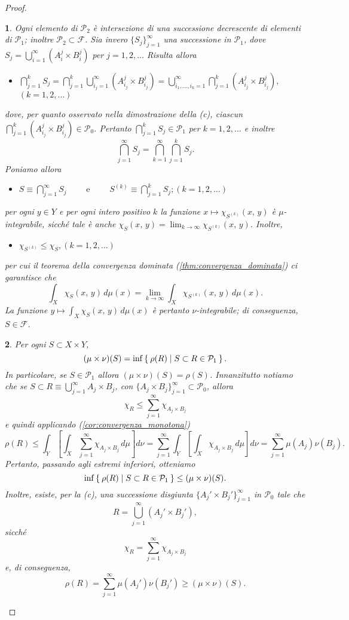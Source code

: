 \documentclass[a4paper,10pt,openright,oneside]{book}
\theoremstyle{theoremstyle}
\theoremstyle{theoremstylewoheader}
\theoremstyle{theoremstyle}
\theoremstyle{proofsecstyle}
\newtheorem{proofsec}{}
\theoremstyle{nonumberplain}
\newtheorem{proof}{Dim.}
\newcommand{\FF}{\ensuremath{\mathcal{F}}}
\newcommand{\PP}{\ensuremath{\mathcal{P}}}
\newcommand{\mymath}[2]{\begin{itemize}%
  \item[]\hfill\hbox{}\ensuremath{\displaystyle #1}\hfill\ensuremath{\displaystyle #2}%
  \end{itemize}}
\begin{document}
\begin{proof}
\begin{proofsec}
\emph{Ogni elemento di $\PP_2$ è intersezione di una successione \emph{decrescente} di elementi di $\PP_1$; inoltre $\PP_2 \subset \FF$.}\hspace{.5em} Sia invero $\{S_j\}_{j=1}^\infty$ una successione in $\PP_1$, dove $S_j = \bigcup_{i=1}^\infty (A_i^j \times B_i^j)$ per $j = 1, 2, \ldots$ Risulta allora \mymath{\bigcap_{j=1}^k S_j = \bigcap_{j=1}^k \bigcup_{i_j=1}^\infty (A_{i_j}^j \times B_{i_j}^j) = \bigcup_{i_1, \ldots, i_k = 1}^\infty \bigcap_{j=1}^k (A_{i_j}^j \times B_{i_j}^j),}{(k = 1, 2, \ldots)} dove, per quanto osservato nella dimostrazione della (c), ciascun $\bigcap_{j=1}^k (A_{i_j}^j \times B_{i_j}^j) \in \PP_0$. Pertanto $\bigcap_{j=1}^k S_j \in \PP_1$ per $k = 1, 2, \ldots$ e inoltre
\[
\bigcap_{j=1}^\infty S_j = \bigcap_{k=1}^\infty \bigcap_{j=1}^k S_j.
\]
Poniamo allora \mymath{S \equiv \bigcap_{j=1}^{\infty} S_j \qquad\text{ e }\qquad S^{(k)} \equiv \bigcap_{j=1}^k S_j;}{(k = 1, 2, \ldots)} per ogni $y \in Y$ e per ogni intero positivo $k$ la funzione $x \mapsto \chi_{S^{(k)}}(x,\, y)$ è $\mu$-integrabile, sicché tale è anche $\chi_S (x,\, y) = \lim_{k \to \infty} \chi_{S^{(k)}} (x,\, y)$. Inoltre, \mymath{\chi_{S^{(k)}} \le \chi_S,}{(k = 1, 2, \ldots)} per cui il teorema della convergenza dominata (\ref{thm:convergenza_dominata}) ci garantisce che 
\[
\int_X \chi_S(x,\, y)\, d\mu(x) = \lim_{k \to \infty} \int_X \chi_{S^{(k)}} (x,\, y)\, d\mu(x).
\]
La funzione $y \mapsto \int_X \chi_S(x,\, y)\, d\mu(x)$ è pertanto $\nu$-integrabile; di conseguenza, $S \in \FF$.
\end{proofsec}

\begin{proofsec}
\emph{Per ogni $S \subset X \times Y$,}
\[
(\mu\times\nu)(S) = \inf\Set{ \rho(R) | S \subset R \in \PP_1 }.
\]
\emph{In particolare, se $S \in \PP_1$ allora $(\mu\times\nu)(S) = \rho(S)$.}\hspace{.5em} Innanzitutto notiamo che se $S \subset R \equiv \bigcup_{j=1}^\infty A_j \times B_j$, con $\{A_j \times B_j\}_{j=1}^\infty \subset \PP_0$, allora
\[
\chi_R \le \sum_{j=1}^\infty \chi_{A_j \times B_j}
\]
e quindi applicando (\ref{cor:convergenza_monotona})
\[
\rho(R) \le \int_Y \left[\int_X \sum_{j=1}^\infty \chi_{A_j \times B_j}\, d\mu\right] d\nu = \sum_{j=1}^\infty \int_Y \left[\int_X \chi_{A_j \times B_j}\, d\mu\right] d\nu = \sum_{j=1}^\infty \mu(A_j)\nu(B_j).
\]
Pertanto, passando agli estremi inferiori, otteniamo
\[
\inf\Set{ \rho(R) | S \subset R \in \PP_1 } \le (\mu\times\nu)(S).
\]
Inoltre, esiste, per la (c), una successione disgiunta $\{A_j' \times B_j'\}_{j=1}^\infty$ in $\PP_0$ tale che
\[
R = \bigcup_{j=1}^\infty (A_j' \times B_j'),
\]
sicché
\[
\chi_R = \sum_{j=1}^\infty \chi_{A_j \times B_j}
\]
e, di conseguenza,
\[
\rho(R) = \sum_{j=1}^\infty \mu(A_j')\nu(B_j') \ge (\mu\times\nu)(S).
\]
\end{proofsec}


\end{proof}
\end{document}
